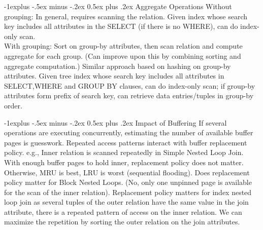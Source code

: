 \documentclass[12pt,landscape]{article}
\makeatletter
\renewcommand{\subsection}{\@startsection{subsection}{2}{0mm}%
                                {-1explus -.5ex minus -.2ex}%
                                {0.5ex plus .2ex}%
                                {\normalfont\normalsize\bfseries}}
\makeatother
\begin{document}
\begin{multicols}{3}
\subsection{Aggregate Operations}
Without grouping: In general, requires scanning the relation. Given index whose search key includes all attributes in the SELECT (if there is no WHERE), can do index-only scan.\\
With grouping: Sort on group-by attributes, then scan relation and compute aggregate for each group. (Can improve upon this by combining sorting and aggregate computation.) Similar approach based on hashing on group-by attributes. Given tree index whose search key includes all attributes in SELECT,WHERE and GROUP BY clauses, can do index-only scan; if group-by attributes form prefix of search key, can retrieve data entries/tuples in group-by order.

\subsection{Impact of Buffering}
If several operations are executing concurrently, estimating the number of available buffer pages is guesswork. Repeated access patterns interact with buffer replacement policy. e.g., Inner relation is scanned repeatedly in Simple Nested Loop Join. With enough buffer pages to hold inner, replacement policy does not matter. Otherwise, MRU is best, LRU is worst (sequential flooding). Does replacement policy matter for Block Nested Loops. (No, only one unpinned page is available for the scan of the inner relation). Replacement policy matters for index nested loop join as several tuples of the outer relation have the same value in the join attribute, there is a repeated pattern of access on the inner relation. We can maximize the repetition by sorting the outer relation on the join attributes.

\scriptsize


\end{multicols}
\end{document}
